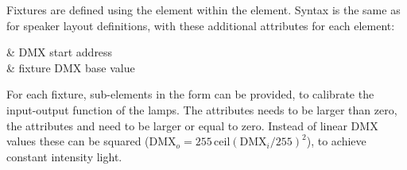 Fixtures are defined using the  element within the
 element.
%
Syntax is the same as for speaker layout definitions, with these
additional attributes for each element:
\begin{tscattributes}
   & DMX start address      \\
 & fixture DMX base value \\
\end{tscattributes}
For each fixture, sub-elements in the form  can be provided, to calibrate the input-output
function of the lamps. The attributes  needs to be larger
than zero, the attributes  and  need to be
larger or equal to zero.
%
Instead of linear DMX values these can be squared ($\textrm{DMX}_o=255\,\textrm{ceil}(\textrm{DMX}_i/255)^2$), to achieve constant intensity light.
